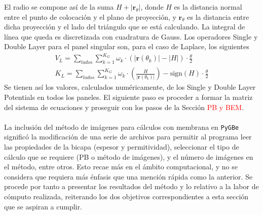 \documentclass[12pt, notitlepage]{article}
\numberwithin{equation}{section}
\begin{document}
El radio se compone así de la suma $H + |\mathbf{r}_\theta|$, donde $H$ es la distancia normal entre el punto de colocación y el plano de proyección, y $\mathbf{r}_\theta$ es la distancia entre dicha proyección y el lado del triángulo que se está calculando. La integral de línea que queda es discretizada con cuadratura de Gauss. Los operadores Single y Double Layer para el panel singular son, para el caso de Laplace, los siguientes
\begin{gather}
V_L = \sum_{lados}\sum_{k=1}^{K_G}\omega_k\cdot (|\mathbf{r}(\theta_k)| - |H|)\cdot\frac{\theta}{2}\\
K_L = \sum_{lados}\sum_{k=1}^{K_G}\omega_k\cdot \left(\frac{H}{|\mathbf{r}(\theta_k)|}\right) - \text{sign}(H) \cdot\frac{\theta}{2}
\end{gather}
Se tienen así los valores, calculados numéricamente, de los Single y Double Layer Potentials en todos los paneles. El siguiente paso es proceder a formar la matriz del sistema de ecuaciones y proseguir con los pasos de la Sección \textcolor{red}{PB y BEM}.\\\\
La inclusión del método de imágenes para cálculos con membrana en \texttt{PyGBe} significó la modificación de una serie de archivos para permitir al programa leer las propiedades de la bicapa (espesor y permitividad), seleccionar el tipo de cálculo que se requiere (PB o método de imágenes), y el número de imágenes en el método, entre otros. Esto recae más en el ámbito computacional, y no se considera que requiera más énfasis que una mención rápida como la anterior. Se procede por tanto a presentar los resultados del método y lo relativo a la labor de cómputo realizada, reiterando los dos objetivos correspondientes a esta sección que se aspiran a cumplir.
\end{document}
